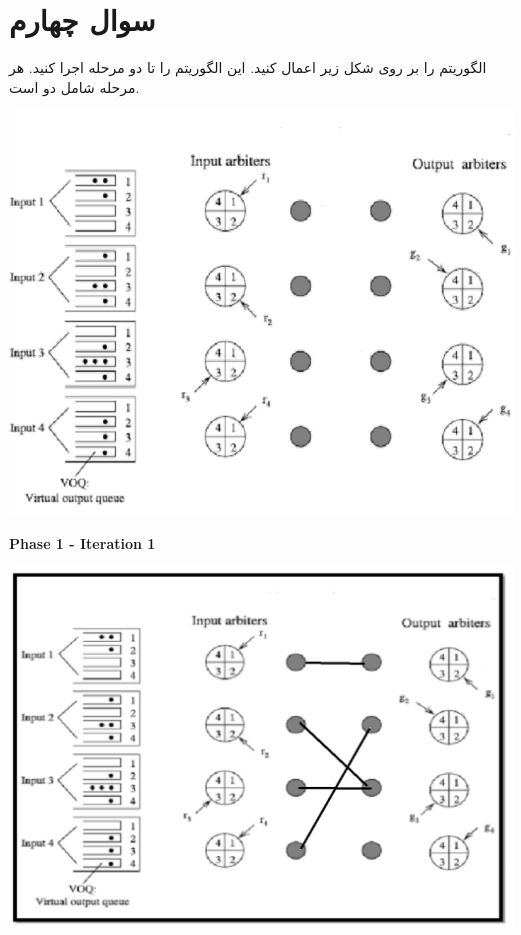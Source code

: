 \section{سوال چهارم}


الگوریتم  را بر روی شکل زیر اعمال کنید. این الگوریتم را تا دو مرحله اجرا کنید. هر مرحله شامل دو  است.


\begin{center}
	\includegraphics*[width=0.6\linewidth]{pics/img2.png}
	\label{شکل مورد نظر}
\end{center}


\begin{qsolve}
	\begin{latin}
		\textbf{Phase 1 - Iteration 1}\\
		
		\begin{center}
			\includegraphics*[width=0.7\linewidth]{pics/img6.png}
		\end{center}
	\end{latin}
\end{qsolve}
\newpage

